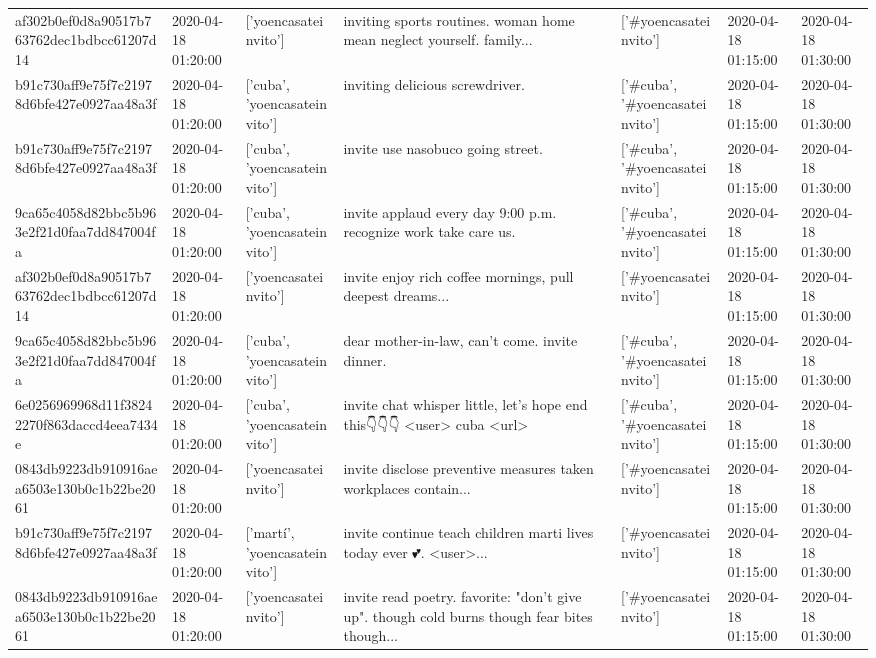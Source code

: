 \begin{tabular}{lllllll}
af302b0ef0d8a90517b763762dec1bdbcc61207d14 & 2020-04-18 01:20:00 & ['yoencasateinvito'] & inviting sports routines. woman home mean neglect yourself. family... & ['#yoencasateinvito'] & 2020-04-18 01:15:00 & 2020-04-18 01:30:00 \\
b91c730aff9e75f7c21978d6bfe427e0927aa48a3f & 2020-04-18 01:20:00 & ['cuba', 'yoencasateinvito'] & inviting delicious screwdriver. & ['#cuba', '#yoencasateinvito'] & 2020-04-18 01:15:00 & 2020-04-18 01:30:00 \\
b91c730aff9e75f7c21978d6bfe427e0927aa48a3f & 2020-04-18 01:20:00 & ['cuba', 'yoencasateinvito'] & invite use nasobuco going street. & ['#cuba', '#yoencasateinvito'] & 2020-04-18 01:15:00 & 2020-04-18 01:30:00 \\
9ca65c4058d82bbc5b963e2f21d0faa7dd847004fa & 2020-04-18 01:20:00 & ['cuba', 'yoencasateinvito'] & invite applaud every day 9:00 p.m. recognize work take care us. & ['#cuba', '#yoencasateinvito'] & 2020-04-18 01:15:00 & 2020-04-18 01:30:00 \\
af302b0ef0d8a90517b763762dec1bdbcc61207d14 & 2020-04-18 01:20:00 & ['yoencasateinvito'] & invite enjoy rich coffee mornings, pull deepest dreams... & ['#yoencasateinvito'] & 2020-04-18 01:15:00 & 2020-04-18 01:30:00 \\
9ca65c4058d82bbc5b963e2f21d0faa7dd847004fa & 2020-04-18 01:20:00 & ['cuba', 'yoencasateinvito'] & dear mother-in-law, can't come. invite dinner. & ['#cuba', '#yoencasateinvito'] & 2020-04-18 01:15:00 & 2020-04-18 01:30:00 \\
6e0256969968d11f38242270f863daccd4eea7434e & 2020-04-18 01:20:00 & ['cuba', 'yoencasateinvito'] & invite chat whisper little, let's hope end this👇👇👇 <user> cuba <url> & ['#cuba', '#yoencasateinvito'] & 2020-04-18 01:15:00 & 2020-04-18 01:30:00 \\
0843db9223db910916aea6503e130b0c1b22be2061 & 2020-04-18 01:20:00 & ['yoencasateinvito'] & invite disclose preventive measures taken workplaces contain... & ['#yoencasateinvito'] & 2020-04-18 01:15:00 & 2020-04-18 01:30:00 \\
b91c730aff9e75f7c21978d6bfe427e0927aa48a3f & 2020-04-18 01:20:00 & ['martí', 'yoencasateinvito'] & invite continue teach children marti lives today ever 💕. <user>... & ['#yoencasateinvito'] & 2020-04-18 01:15:00 & 2020-04-18 01:30:00 \\
0843db9223db910916aea6503e130b0c1b22be2061 & 2020-04-18 01:20:00 & ['yoencasateinvito'] & invite read poetry. favorite: "don't give up". though cold burns though fear bites though... & ['#yoencasateinvito'] & 2020-04-18 01:15:00 & 2020-04-18 01:30:00 \\

\end{tabular}

